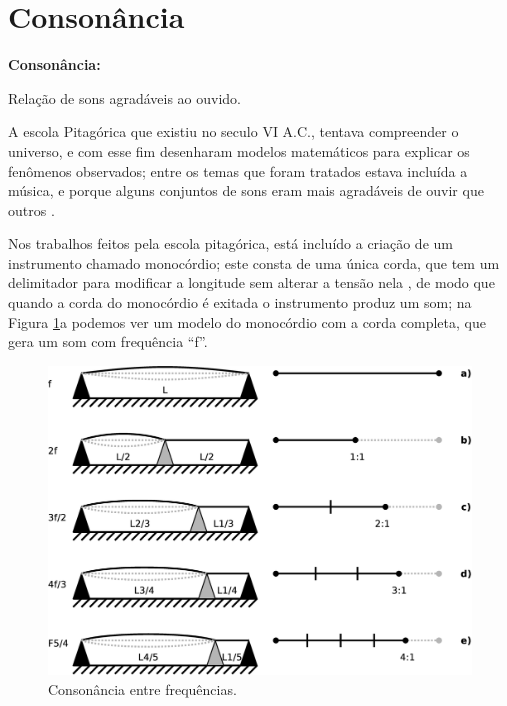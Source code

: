 \section{Consonância}
\label{sec:consonancia}

\begin{tcbinformation} 
\textbf{Consonância:}
\label{ref:consonancia}

Relação de sons agradáveis ao ouvido.

\end{tcbinformation} 


A escola Pitagórica que existiu no seculo VI A.C.,
tentava compreender o universo, e
com esse fim desenharam modelos matemáticos para explicar 
os fenômenos observados;
entre os temas que foram tratados estava incluída a música,
e porque alguns conjuntos de sons eram mais 
agradáveis de ouvir que outros \cite[pp. 11]{arbones2012armonia}.

Nos trabalhos feitos pela escola pitagórica, 
está incluído a criação de um instrumento chamado monocórdio;
este consta de uma única corda,
que tem um delimitador para modificar a longitude sem alterar a tensão nela \cite[pp. 12]{arbones2012armonia},
de modo que quando a corda do monocórdio é exitada o instrumento produz um som;
na Figura \ref{fig:consonancia}a podemos ver um modelo do monocórdio com a corda completa, 
que gera um som com frequência ``f''.
\begin{figure}[!h]
  \centering
    \includegraphics[width=\textwidth]{chapters/cap-musica-composer/consonancia0.eps}
\caption{Consonância entre frequências.}
\label{fig:consonancia}
\end{figure}

